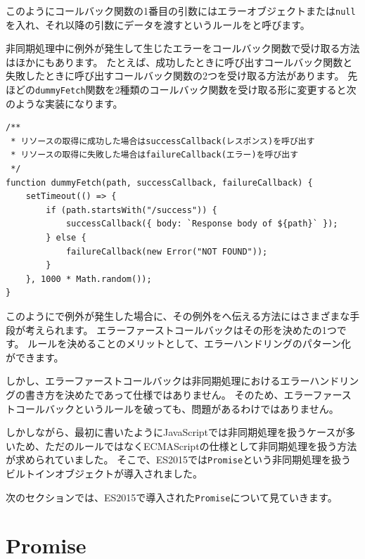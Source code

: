 このようにコールバック関数の1番目の引数にはエラーオブジェクトまたは\texttt{null}を入れ、それ以降の引数にデータを渡すというルールを\textbf{}と呼びます。

非同期処理中に例外が発生して生じたエラーをコールバック関数で受け取る方法はほかにもあります。
たとえば、成功したときに呼び出すコールバック関数と失敗したときに呼び出すコールバック関数の2つを受け取る方法があります。
先ほどの\texttt{dummyFetch}関数を2種類のコールバック関数を受け取る形に変更すると次のような実装になります。

\begin{lstlisting}
/**
 * リソースの取得に成功した場合はsuccessCallback(レスポンス)を呼び出す
 * リソースの取得に失敗した場合はfailureCallback(エラー)を呼び出す
 */
function dummyFetch(path, successCallback, failureCallback) {
    setTimeout(() => {
        if (path.startsWith("/success")) {
            successCallback({ body: `Response body of ${path}` });
        } else {
            failureCallback(new Error("NOT FOUND"));
        }
    }, 1000 * Math.random());
}
\end{lstlisting}

このように\textbf{}で例外が発生した場合に、その例外を\textbf{}へ伝える方法にはさまざまな手段が考えられます。
エラーファーストコールバックはその形を決めた\textbf{}の1つです。
ルールを決めることのメリットとして、エラーハンドリングのパターン化ができます。

しかし、エラーファーストコールバックは非同期処理におけるエラーハンドリングの書き方を決めた\textbf{}であって仕様ではありません。
そのため、エラーファーストコールバックというルールを破っても、問題があるわけではありません。

しかしながら、最初に書いたようにJavaScriptでは非同期処理を扱うケースが多いため、ただのルールではなくECMAScriptの仕様として非同期処理を扱う方法が求められていました。
そこで、ES2015では\texttt{Promise}という非同期処理を扱うビルトインオブジェクトが導入されました。

次のセクションでは、ES2015で導入された\texttt{Promise}について見ていきます。

\hypertarget{promise}{%
\section[Promise]{Promise\,\protect{}}\label{promise}}

